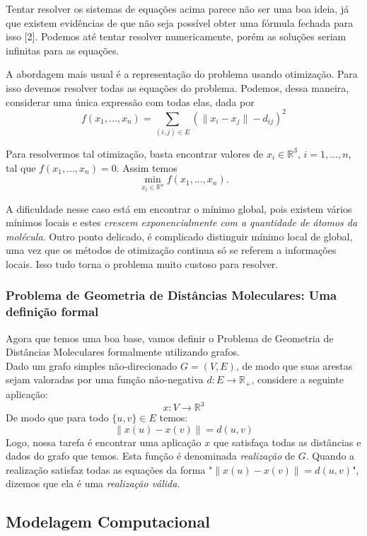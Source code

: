 \documentclass[a4paper,12pt]{article}
\begin{document}
\begin{itemize}
		Tentar resolver os sistemas de equações acima parece não ser uma boa ideia, já que existem evidências de que não seja possível obter uma fórmula fechada para isso [2]. Podemos até tentar resolver numericamente, porém as soluções seriam infinitas para as equações.
		
		A abordagem mais usual é a representação do problema usando otimização. Para isso devemos  resolver todas as equações do problema. Podemos, dessa maneira, considerar uma única expressão com todas elas, dada por
		$$ f(x_1, ...,x_n) \equal \sum_{(i,j) \in E} (\|x_i - x_j\| - d_{ij})^2
		$$
		
		Para resolvermos tal otimização, basta encontrar valores de $x_i \in \mathbb{R}^3$, $i = 1, ..., n$, tal que $f(x_1, ...,x_n)=0.$ Assim temos
		$$ \min_{x_t \in\mathbb{R}^n} f(x_1, ...,x_n).
		$$
		
		A dificuldade nesse caso está em encontrar o mínimo global, pois existem vários mínimos locais e estes\textit{ crescem exponencialmente com a  quantidade de átomos da molécula}. Outro ponto delicado, é complicado distinguir mínimo local de global, uma vez que os métodos de otimização continua só se referem a informações locais. Isso tudo torna o problema muito custoso para resolver.
	\end{itemize}
	
	\subsubsection*{Problema de Geometria de Distâncias Moleculares: Uma definição formal}
	Agora que temos uma boa base, vamos definir o Problema de Geometria de Distâncias Moleculares formalmente utilizando grafos.
	\\
	
	Dado um grafo simples não-direcionado $G=(V,E)$, de modo que suas arestas sejam valoradas por uma função não-negativa $d:E\rightarrow\mathbb{R_+}$, considere a seguinte aplicação:
	$$x:V\rightarrow\mathbb{R}^3
	$$
	De modo que para todo $\{u,v\}\in E$ temos:
	$$\|x(u)-x(v)\|=d({u,v})
	$$
	Logo, nossa tarefa é encontrar uma aplicação $x$ que satisfaça todas as distâncias e dados do grafo que temos. Esta função é denominada \textit{realização} de $G$. Quando a realização satisfaz todas as equações da forma "$\|x(u)-x(v)\|=d({u,v})$", dizemos que ela é uma \textit{realização válida}.
	
	
	\subsection{Modelagem Computacional}
	
\end{document}
